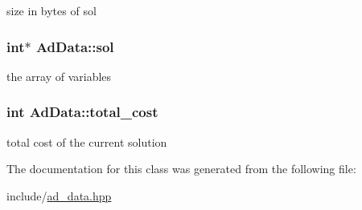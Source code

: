 size in bytes of sol \hypertarget{classAdData_a0b104c9abf7d64d2bbeb330dd237fd92}{
\subsubsection[{sol}]{\setlength{\rightskip}{0pt plus 5cm}int$\ast$ {\bf \-Ad\-Data\-::sol}}}\label{classAdData_a0b104c9abf7d64d2bbeb330dd237fd92}
the array of variables \hypertarget{classAdData_aac016a9f725d10bdcc414d089a493b6e}{
\subsubsection[{total\-\_\-cost}]{\setlength{\rightskip}{0pt plus 5cm}int {\bf \-Ad\-Data\-::total\-\_\-cost}}}\label{classAdData_aac016a9f725d10bdcc414d089a493b6e}
total cost of the current solution 

\-The documentation for this class was generated from the following file\-:\begin{DoxyCompactItemize}
\item 
include/\hyperlink{ad__data_8hpp}{ad\-\_\-data.\-hpp}\end{DoxyCompactItemize}
